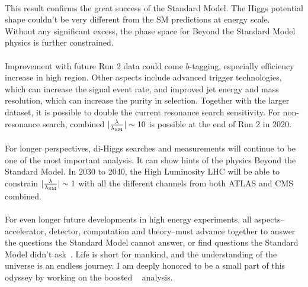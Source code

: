 \paragraph{}
This result confirms the great success of the Standard Model.
The Higgs potential shape couldn't be very different from the SM predictions at \TeV energy scale.
Without any significant excess, the phase space for Beyond the Standard Model physics is further constrained.

\paragraph{}
Improvement with future Run 2 data could come $b$-tagging, especially efficiency increase in high \pt region. 
Other aspects include advanced trigger technologies, which can increase the signal event rate, and improved jet energy and mass resolution, which can increase the purity in selection.
Together with the larger dataset, it is possible to double the current resonance search sensitivity. 
For non-resonance search, combined $|\frac{\rm\lambda}{\rm\lambda_{SM}}| \sim 10$ is possible at the end of Run 2 in 2020.

\paragraph{}
For longer perspectives, di-Higgs searches and measurements will continue to be one of the most important analysis. 
It can show hints of the physics Beyond the Standard Model. 
In 2030 to 2040, the High Luminosity LHC will be able to constrain $|\frac{\rm\lambda}{\rm\lambda_{SM}}| \sim 1$ with all the different channels from both ATLAS and CMS combined. 

\paragraph{}
For even longer future developments in high energy experiments, all aspects--accelerator, detector, computation and theory--must advance together to answer the questions the Standard Model cannot answer, or find questions the Standard Model didn't ask~\cite{Richter:2014pga, Hawking:2018tcn}. 
Life is short for mankind, and the understanding of the universe is an endless journey. 
I am deeply honored to be a small part of this odyssey by working on the boosted \pptofourb~ analysis.
